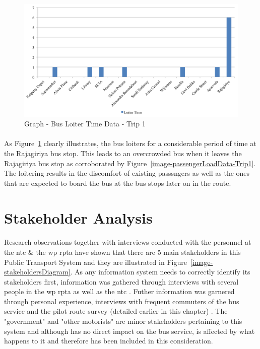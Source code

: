 \begin {figure} [H]
\centering
\includegraphics[scale=0.5]{loiterTimeData-Trip1}
\caption [Graph - Bus Loiter Time Data - Trip 1] {Graph - Bus Loiter Time Data - Trip 1}
\label {image-loiterTimeData-Trip1}
\end {figure}

\paragraph{} As Figure~\ref{image-loiterTimeData-Trip1} clearly illustrates, the bus loiters for a considerable period of time at the Rajagiriya bus stop. This leads to an overcrowded bus when it leaves the Rajagiriya bus stop as corroborated by Figure~\ref{image-passengerLoadData-Trip1}. The loitering results in the discomfort of existing passsngers as well as the ones that are expected to board the bus at the bus stops later on in the route.



\section {Stakeholder Analysis}
\label {StakeholderAnalysis}

\paragraph{} Research observations together with interviews conducted with the personnel at the \acrshort{ntc} \& the \acrshort{wp} \acrshort{rpta} have shown that there are 5 main stakeholders in this Public Transport System and they are illustrated in Figure~\ref{image-stakeholdersDiagram}. As any information system needs to correctly identify its stakeholders first, information was gathered through interviews with several people in the \acrshort{wp} \acrshort{rpta} as well as the \acrshort{ntc} \cite{Mahesh2013a, Theja2013a, Mahesh2013b, Navaratne2013a, Navaratne2013b,  Ranjith2013a, Weerawardena2013, Piyadasa2013}. Futher information was garnered through personal experience, interviews with frequent commuters of the bus service and the pilot route survey (detailed earlier in this chapter) \cite{Bandara2013, Pallegoda2013, DeSilva2013, Senevirathne2013}. The "government" and "other motorists" are minor stakeholders pertaining to this system and although has no direct impact on the bus service, is affected by what happens to it and therefore has been included in this consideration.


